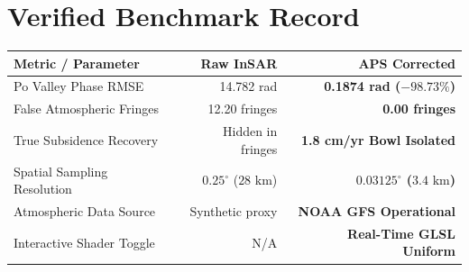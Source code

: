 \documentclass[10pt,letterpaper]{article}
\begin{document}
\begin{minipage}[t]{0.51\textwidth}
    \section*{Verified Benchmark Record}
    \footnotesize
    \begin{tabularx}{\linewidth}{X r r}
        \toprule
        \textbf{Metric / Parameter} & \textbf{Raw InSAR} & \textbf{APS Corrected} \\
        \midrule
        Po Valley Phase RMSE & 14.782 rad & \textbf{0.1874 rad ($-98.73\%$)} \\
        False Atmospheric Fringes & 12.20 fringes & \textbf{0.00 fringes} \\
        True Subsidence Recovery & Hidden in fringes & \textbf{1.8 cm/yr Bowl Isolated} \\
        Spatial Sampling Resolution & $0.25^\circ$ ($28\text{ km}$) & \textbf{$0.03125^\circ$ ($3.4\text{ km}$)} \\
        Atmospheric Data Source & Synthetic proxy & \textbf{NOAA GFS Operational} \\
        Interactive Shader Toggle & N/A & \textbf{Real-Time GLSL Uniform} \\
        \bottomrule
    \end{tabularx}
\end{minipage}
\hfill
\end{document}
